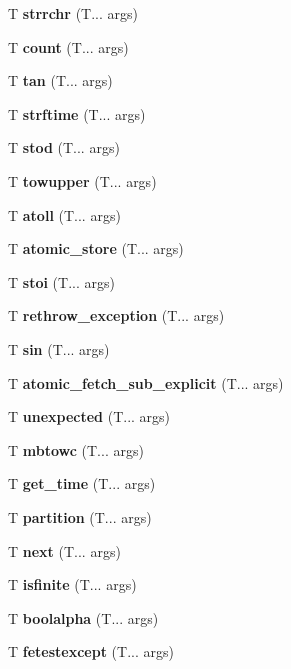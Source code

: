 \begin{DoxyCompactItemize}
\mbox{\label{strrchr}} 
T \textbf{ strrchr} (T... args)
\item 
\mbox{\label{count}} 
T \textbf{ count} (T... args)
\item 
\mbox{\label{tan}} 
T \textbf{ tan} (T... args)
\item 
\mbox{\label{strftime}} 
T \textbf{ strftime} (T... args)
\item 
\mbox{\label{stof}} 
T \textbf{ stod} (T... args)
\item 
\mbox{\label{towupper}} 
T \textbf{ towupper} (T... args)
\item 
\mbox{\label{atoi}} 
T \textbf{ atoll} (T... args)
\item 
\mbox{\label{atomic_store}} 
T \textbf{ atomic\+\_\+store} (T... args)
\item 
\mbox{\label{stol}} 
T \textbf{ stoi} (T... args)
\item 
\mbox{\label{rethrow_exception}} 
T \textbf{ rethrow\+\_\+exception} (T... args)
\item 
\mbox{\label{sin}} 
T \textbf{ sin} (T... args)
\item 
\mbox{\label{atomic_fetch_sub}} 
T \textbf{ atomic\+\_\+fetch\+\_\+sub\+\_\+explicit} (T... args)
\item 
\mbox{\label{unexpected}} 
T \textbf{ unexpected} (T... args)
\item 
\mbox{\label{mbtowc}} 
T \textbf{ mbtowc} (T... args)
\item 
\mbox{\label{get_time}} 
T \textbf{ get\+\_\+time} (T... args)
\item 
\mbox{\label{partition}} 
T \textbf{ partition} (T... args)
\item 
\mbox{\label{next}} 
T \textbf{ next} (T... args)
\item 
\mbox{\label{isfinite}} 
T \textbf{ isfinite} (T... args)
\item 
\mbox{\label{boolalpha}} 
T \textbf{ boolalpha} (T... args)
\item 
\mbox{\label{fetestexcept}} 
T \textbf{ fetestexcept} (T... args)
\item 
\mbox{\label{mbrlen}} 

\end{DoxyCompactItemize}

